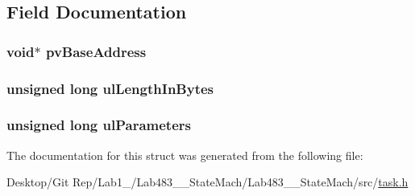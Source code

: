 \subsection{Field Documentation}
\hypertarget{structx_m_e_m_o_r_y___r_e_g_i_o_n_a5c540d9e8ba79b50b9600f7225d41268}{
\subsubsection[{pv\-Base\-Address}]{\setlength{\rightskip}{0pt plus 5cm}void$\ast$ pv\-Base\-Address}}\label{structx_m_e_m_o_r_y___r_e_g_i_o_n_a5c540d9e8ba79b50b9600f7225d41268}
\hypertarget{structx_m_e_m_o_r_y___r_e_g_i_o_n_a3bab560a2b429ca0430ec91ce759c9f8}{
\subsubsection[{ul\-Length\-In\-Bytes}]{\setlength{\rightskip}{0pt plus 5cm}unsigned long ul\-Length\-In\-Bytes}}\label{structx_m_e_m_o_r_y___r_e_g_i_o_n_a3bab560a2b429ca0430ec91ce759c9f8}
\hypertarget{structx_m_e_m_o_r_y___r_e_g_i_o_n_a9c337bc748fd9f212e8256d53d0cbec4}{
\subsubsection[{ul\-Parameters}]{\setlength{\rightskip}{0pt plus 5cm}unsigned long ul\-Parameters}}\label{structx_m_e_m_o_r_y___r_e_g_i_o_n_a9c337bc748fd9f212e8256d53d0cbec4}


The documentation for this struct was generated from the following file\-:\begin{DoxyCompactItemize}
\item 
Desktop/\-Git Rep/\-Lab1\-\_/\-Lab483\-\_\-\_\-\-State\-Mach/\-Lab483\-\_\-\_\-\-State\-Mach/src/\hyperlink{task_8h}{task.\-h}\end{DoxyCompactItemize}
